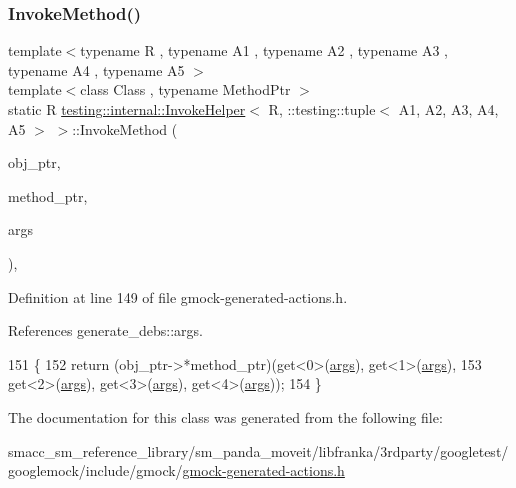 \subsubsection{\texorpdfstring{Invoke\+Method()}{InvokeMethod()}}
{\footnotesize\ttfamily template$<$typename R , typename A1 , typename A2 , typename A3 , typename A4 , typename A5 $>$ \\
template$<$class Class , typename Method\+Ptr $>$ \\
static R \hyperlink{classtesting_1_1internal_1_1InvokeHelper}{testing\+::internal\+::\+Invoke\+Helper}$<$ R, \+::testing\+::tuple$<$ A1, A2, A3, A4, A5 $>$ $>$\+::Invoke\+Method (\begin{DoxyParamCaption}\item[{Class $\ast$}]{obj\+\_\+ptr,  }\item[{Method\+Ptr}]{method\+\_\+ptr,  }\item[{const \+::testing\+::tuple$<$ A1, A2, A3, A4, A5 $>$ \&}]{args }\end{DoxyParamCaption})\hspace{0.3cm}{\ttfamily [inline]}, {\ttfamily [static]}}



Definition at line 149 of file gmock-\/generated-\/actions.\+h.



References generate\+\_\+debs\+::args.


\begin{DoxyCode}
151                                                                       \{
152            \textcolor{keywordflow}{return} (obj\_ptr->*method\_ptr)(get<0>(\hyperlink{namespacegenerate__debs_a75f9143e38df82d83b2e8a6f99cae02c}{args}), get<1>(\hyperlink{namespacegenerate__debs_a75f9143e38df82d83b2e8a6f99cae02c}{args}),
153                get<2>(\hyperlink{namespacegenerate__debs_a75f9143e38df82d83b2e8a6f99cae02c}{args}), get<3>(\hyperlink{namespacegenerate__debs_a75f9143e38df82d83b2e8a6f99cae02c}{args}), get<4>(\hyperlink{namespacegenerate__debs_a75f9143e38df82d83b2e8a6f99cae02c}{args}));
154   \}
\end{DoxyCode}


The documentation for this class was generated from the following file\+:\begin{DoxyCompactItemize}
\item 
smacc\+\_\+sm\+\_\+reference\+\_\+library/sm\+\_\+panda\+\_\+moveit/libfranka/3rdparty/googletest/googlemock/include/gmock/\hyperlink{gmock-generated-actions_8h}{gmock-\/generated-\/actions.\+h}\end{DoxyCompactItemize}
